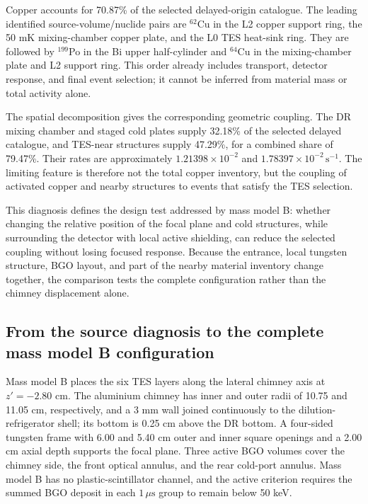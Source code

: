 \documentclass[11pt]{article}
\newcommand{\cps}{\ensuremath{\,\mathrm{s^{-1}}}}
\begin{document}
Copper accounts for 70.87\% of the selected delayed-origin catalogue. The leading identified source-volume/nuclide pairs are $^{62}$Cu in the L2 copper support ring, the 50 mK mixing-chamber copper plate, and the L0 TES heat-sink ring. They are followed by $^{199}$Po in the Bi upper half-cylinder and $^{64}$Cu in the mixing-chamber plate and L2 support ring. This order already includes transport, detector response, and final event selection; it cannot be inferred from material mass or total activity alone.

The spatial decomposition gives the corresponding geometric coupling. The DR mixing chamber and staged cold plates supply 32.18\% of the selected delayed catalogue, and TES-near structures supply 47.29\%, for a combined share of 79.47\%. Their rates are approximately $1.21398\times10^{-2}$ and $1.78397\times10^{-2}\cps$. The limiting feature is therefore not the total copper inventory, but the coupling of activated copper and nearby structures to events that satisfy the TES selection.

This diagnosis defines the design test addressed by mass model B: whether changing the relative position of the focal plane and cold structures, while surrounding the detector with local active shielding, can reduce the selected coupling without losing focused response. Because the entrance, local tungsten structure, BGO layout, and part of the nearby material inventory change together, the comparison tests the complete configuration rather than the chimney displacement alone.

\FloatBarrier

\subsection{From the source diagnosis to the complete mass model B configuration}
\label{subsec:optimized_shield_results}

Mass model B places the six TES layers along the lateral chimney axis at $z'=-2.80$ cm. The aluminium chimney has inner and outer radii of 10.75 and 11.05 cm, respectively, and a 3 mm wall joined continuously to the dilution-refrigerator shell; its bottom is 0.25 cm above the DR bottom. A four-sided tungsten frame with 6.00 and 5.40 cm outer and inner square openings and a 2.00 cm axial depth supports the focal plane. Three active BGO volumes cover the chimney side, the front optical annulus, and the rear cold-port annulus. Mass model B has no plastic-scintillator channel, and the active criterion requires the summed BGO deposit in each $1\,\mu\mathrm{s}$ group to remain below 50 keV.
\end{document}
